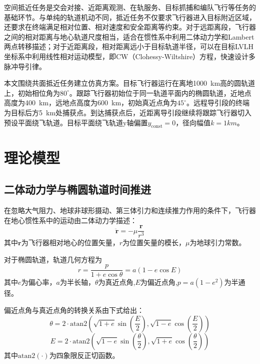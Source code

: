 \documentclass[10.5pt,twocolumn]{aaas}
\begin{document}
\wuhao


空间抵近任务是交会对接、近距离观测、在轨服务、目标抓捕和编队飞行等任务的基础环节。与单纯的轨道机动不同，抵近任务不仅要求飞行器进入目标附近区域，还要求在终端满足相对位置、相对速度和安全距离等约束。对于远距离段，飞行器之间的相对距离与地心轨道尺度相当，适合在惯性系中利用二体动力学和Lambert两点转移描述；对于近距离段，相对距离远小于目标轨道半径，可以在目标LVLH坐标系中利用线性相对运动模型，即CW（Clohessy-Wiltshire）方程，快速设计多脉冲导引律。

本文围绕共面抵近任务建立仿真方案。目标飞行器运行在离地\SI{1000}{km}高的圆轨道上，初始相位角为$80^\circ$。跟踪飞行器初始位于同一轨道平面内的椭圆轨道，近地点高度为\SI{400}{km}，远地点高度为\SI{600}{km}，初始真近点角为$45^\circ$。远程导引段的终端为目标后方\SI{5}{km}处捕获点。到达捕获点后，近距离导引段继续将跟踪飞行器切入预设平面绕飞轨道。目标平面绕飞轨道y轴偏置$y_\mathrm{const}=0$，径向幅值$k=1\si{km}$。

\section{理论模型}

\subsection{二体动力学与椭圆轨道时间推进}\label{subsec:orbit-time}

在忽略大气阻力、地球非球形摄动、第三体引力和连续推力作用的条件下，飞行器在地心惯性系中的运动由二体动力学描述：
\begin{equation}
  \ddot{\boldsymbol{r}}=-\mu\frac{\boldsymbol{r}}{r^3}
\end{equation}
其中$\boldsymbol{r}$为飞行器相对地心的位置矢量，$r$为位置矢量的模长，$\mu$为地球引力常数。

对于椭圆轨道，轨道几何方程为
\begin{equation}
  r=\frac{p}{1+e\cos\theta}=a\left(1-e\cos E\right)
\end{equation}
其中$e$为偏心率，$a$为半长轴，$\theta$为真近点角,$E$为偏近点角,$p=a(1-e^2)$为半通径。

偏近点角与真近点角的转换关系由下式给出：
\begin{equation}
  \theta=2\cdot\mathrm{atan2}\left(
  \sqrt{1+e}\sin\left(\frac{E}{2}\right),
  \sqrt{1-e}\cos\left(\frac{E}{2}\right)
  \right)
\end{equation}
\begin{equation}
  E=2\cdot\mathrm{atan2}\left(
  \sqrt{1-e}\sin\left(\frac{\theta}{2}\right),
  \sqrt{1+e}\cos\left(\frac{\theta}{2}\right)
  \right)
\end{equation}
其中$\mathrm{atan2}\left(\cdot\right)$为四象限反正切函数。
\end{document}
